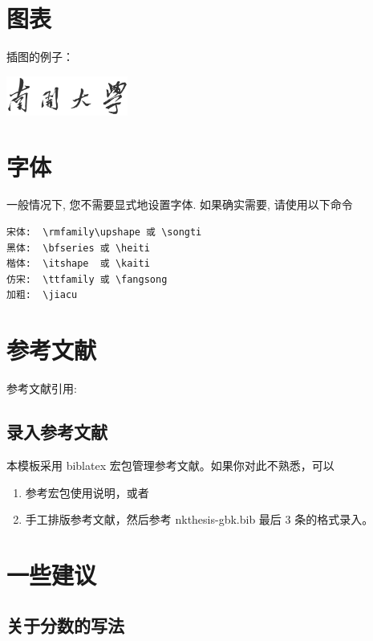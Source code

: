 \section{图表}

插图的例子：

\begin{center}
\includegraphics[bb=0 0 2984 969,width=40mm]{nankaidaxue.pdf}
\end{center}

\section{字体}

一般情况下, 您不需要显式地设置字体. 如果确实需要, 请使用以下命令

\begin{verbatim}
宋体:  \rmfamily\upshape 或 \songti
黑体:  \bfseries 或 \heiti
楷体:  \itshape  或 \kaiti
仿宋:  \ttfamily 或 \fangsong
加粗:  \jiacu
\end{verbatim}


\section{参考文献} \label{manual:ref}
参考文献引用:
\cite{JiangXiZhou,Timoshenko}
\cite[Theorem 1]{ChenCheChen2001}

\subsection{录入参考文献}

本模板采用 biblatex 宏包管理参考文献。如果你对此不熟悉，可以
\begin{enumerate}
\item 参考宏包使用说明，或者
\item 手工排版参考文献，然后参考 nkthesis-gbk.bib 最后 3 条的格式录入。
\end{enumerate}



\section{一些建议}
\subsection{关于分数的写法}


